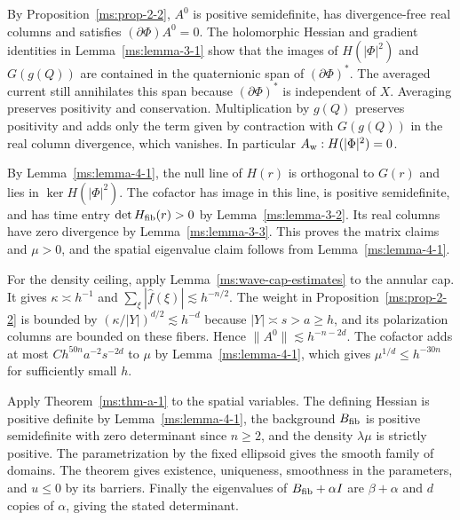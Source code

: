 By Proposition~\ref{ms:prop-2-2}, $A^0$ is positive semidefinite, has divergence-free real columns and satisfies $(\partial\Phi)A^0=0$. The holomorphic Hessian and gradient identities in Lemma~\ref{ms:lemma-3-1} show that the images of $H(|\Phi|^2)$ and $G(g(Q))$ are contained in the quaternionic span of $(\partial\Phi)^*$. The averaged current still annihilates this span because $(\partial\Phi)^*$ is independent of $X$. Averaging preserves positivity and conservation. Multiplication by $g(Q)$ preserves positivity and adds only the term given by contraction with $G(g(Q))$ in the real column divergence, which vanishes. In particular $A_{\rm w}:H(|\Phi|^2)=0$.

By Lemma~\ref{ms:lemma-4-1}, the null line of $H(r)$ is orthogonal to $G(r)$ and lies in $\ker H(|\Phi|^2)$. The cofactor has image in this line, is positive semidefinite, and has time entry $\det H_{\rm fib}(r)>0$ by Lemma~\ref{ms:lemma-3-2}. Its real columns have zero divergence by Lemma~\ref{ms:lemma-3-3}. This proves the matrix claims and $\mu>0$, and the spatial eigenvalue claim follows from Lemma~\ref{ms:lemma-4-1}.

For the density ceiling, apply Lemma~\ref{ms:wave-cap-estimates} to the annular cap. It gives $\kappa\asymp h^{-1}$ and $\sum_\xi |\widehat f(\xi)|\lesssim h^{-n/2}$. The weight in Proposition~\ref{ms:prop-2-2} is bounded by $(\kappa/|Y|)^{d/2}\lesssim h^{-d}$ because $|Y|\asymp s>a\ge h$, and its polarization columns are bounded on these fibers. Hence $\|A^0\|\lesssim h^{-n-2d}$. The cofactor adds at most $Ch^{50n}a^{-2}s^{-2d}$ to $\mu$ by Lemma~\ref{ms:lemma-4-1}, which gives $\mu^{1/d}\le h^{-30n}$ for sufficiently small $h$.

Apply Theorem~\ref{ms:thm-a-1} to the spatial variables. The defining Hessian is positive definite by Lemma~\ref{ms:lemma-4-1}, the background $B_{\rm fib}$ is positive semidefinite with zero determinant since $n\ge2$, and the density $\lambda\mu$ is strictly positive. The parametrization by the fixed ellipsoid gives the smooth family of domains. The theorem gives existence, uniqueness, smoothness in the parameters, and $u\le0$ by its barriers. Finally the eigenvalues of $B_{\rm fib}+\alpha I$ are $\beta+\alpha$ and $d$ copies of $\alpha$, giving the stated determinant.
